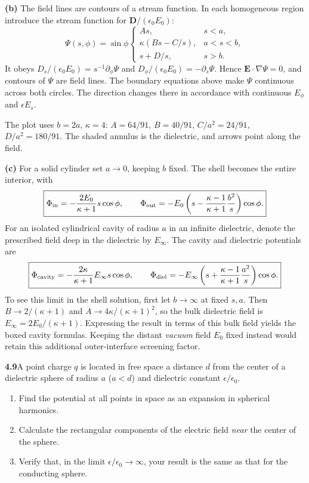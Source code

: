 \textbf{(b)} The field lines are contours of a stream function.
In each homogeneous region introduce the stream
function for $\mathbf D/(\epsilon_0E_0)$:
\[
\Psi(s,\phi)=\sin\phi\begin{cases}
As,&s<a,\\
\kappa(Bs-C/s),&a<s<b,\\
s+D/s,&s>b.
\end{cases}
\]
It obeys $D_s/(\epsilon_0E_0)=s^{-1}\partial_\phi\Psi$ and
$D_\phi/(\epsilon_0E_0)=-\partial_s\Psi$. Hence
$\mathbf E\cdot\nabla\Psi=0$, and contours of $\Psi$ are field lines.
The boundary equations above make $\Psi$ continuous across both circles.
The direction changes there in accordance with continuous $E_\phi$
and $\epsilon E_s$.

The plot uses $b=2a$, $\kappa=4$:
$A=64/91$, $B=40/91$, $C/a^2=24/91$, $D/a^2=180/91$.
The shaded annulus is the dielectric, and arrows point along the field.
\begin{center}

\end{center}

\textbf{(c)} For a solid cylinder set $a\to0$, keeping $b$ fixed.
The shell becomes the entire interior, with
\[
\boxed{\Phi_{\rm in}=-\frac{2E_0}{\kappa+1}s\cos\phi,\qquad
\Phi_{\rm out}=-E_0\left(s-\frac{\kappa-1}{\kappa+1}\frac{b^2}{s}\right)\cos\phi.}
\]
For an isolated cylindrical cavity of radius $a$ in an infinite
dielectric, denote the prescribed field deep in the dielectric by
$E_\infty$. The cavity and dielectric potentials are
\[
\boxed{\Phi_{\rm cavity}=-\frac{2\kappa}{\kappa+1}E_\infty s\cos\phi,\qquad
\Phi_{\rm diel}=-E_\infty\left(s+\frac{\kappa-1}{\kappa+1}\frac{a^2}{s}\right)\cos\phi.}
\]
To see this limit in the shell solution, first let $b\to\infty$ at
fixed $s,a$. Then $B\to2/(\kappa+1)$ and
$A\to4\kappa/(\kappa+1)^2$, so the bulk dielectric field is
$E_\infty=2E_0/(\kappa+1)$. Expressing the result in terms of this
bulk field yields the boxed cavity formulas. Keeping the distant
\emph{vacuum} field $E_0$ fixed instead would retain this additional
outer-interface screening factor.

\par\bigskip
\noindent\textbf{4.9}\quad A point charge $q$ is located in free space a distance $d$ from the center of a dielectric sphere of radius $a$ ($a<d$) and dielectric constant $\epsilon/\epsilon_{0}$.
\begin{enumerate}
\item[(a)] Find the potential at all points in space as an expansion in spherical harmonics.
\item[(b)] Calculate the rectangular components of the electric field \emph{near} the center of the sphere.
\item[(c)] Verify that, in the limit $\epsilon/\epsilon_{0}\to\infty$, your result is the same as that for the conducting sphere.
\end{enumerate}
\solution

